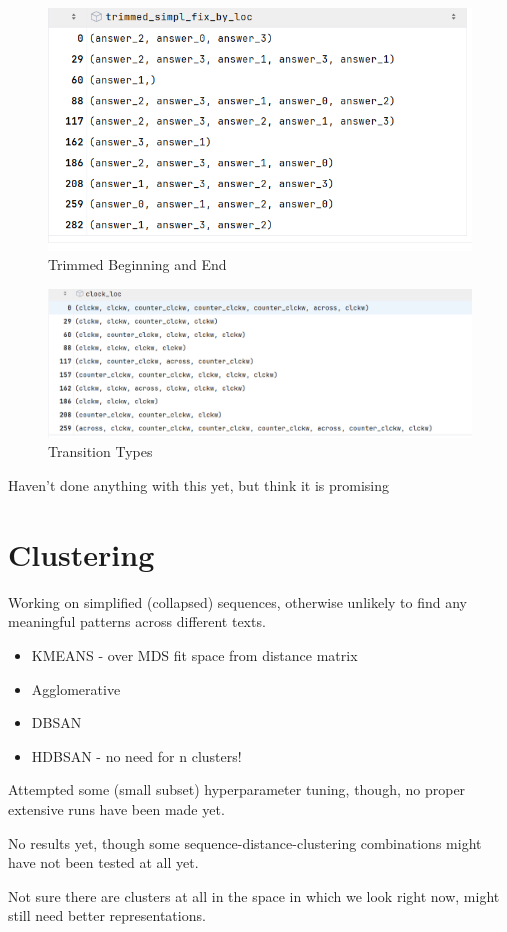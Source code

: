 \documentclass{article}
\begin{document}
\begin{figure}[H]
    \centering
    \includegraphics[width=1\linewidth]{plots/etc/trim_top_and_bottom.PNG}
    \caption{Trimmed Beginning and End}
    \label{fig:enter-label}
\end{figure}

\begin{figure}[H]
    \centering
    \includegraphics[width=1\linewidth]{plots/etc/clock.PNG}
    \caption{Transition Types}
    \label{fig:enter-label}
\end{figure}
Haven't done anything with this yet, but think it is promising

\section{Clustering}

Working on simplified (collapsed) sequences, otherwise unlikely to find any meaningful patterns across different texts.

\begin{itemize}
    \item KMEANS - over MDS fit space from distance matrix
    \item Agglomerative
    \item DBSAN
    \item HDBSAN - no need for n clusters!
\end{itemize}

Attempted some (small subset) hyperparameter tuning, though, no proper extensive runs have been made yet.

No results yet, though some sequence-distance-clustering combinations might have not been tested at all yet.

Not sure there are clusters at all in the space in which we look right now, might still need better representations. 
\end{document}
